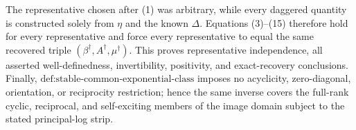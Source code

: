 The representative chosen after (1) was arbitrary, while every daggered quantity is constructed solely from \(\eta\) and the known \(\Delta\).  Equations (3)--(15) therefore hold for every representative and force every representative to equal the same recovered triple \((\beta^\dagger,A^\dagger,\mu^\dagger)\).  This proves representative independence, all asserted well-definedness, invertibility, positivity, and exact-recovery conclusions.  Finally, \(\text{def:stable-common-exponential-class}\) imposes no acyclicity, zero-diagonal, orientation, or reciprocity restriction; hence the same inverse covers the full-rank cyclic, reciprocal, and self-exciting members of the image domain subject to the stated principal-log strip.